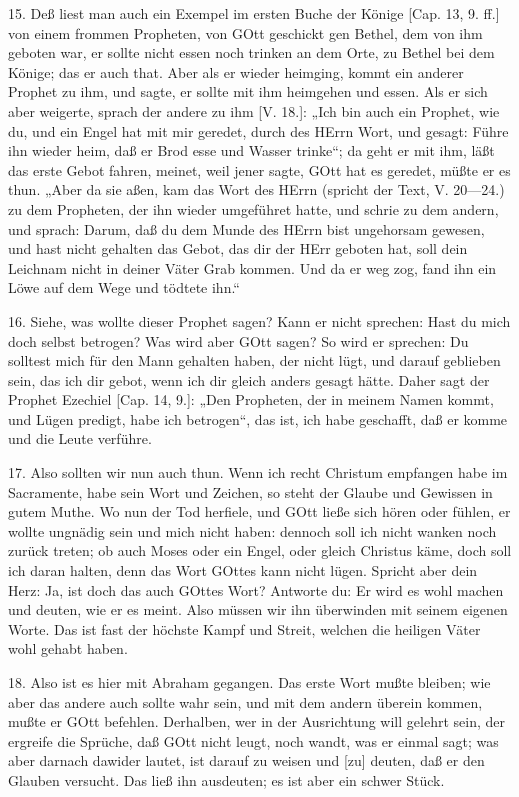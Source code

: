 15. Deß liest man auch ein Exempel im ersten Buche der Könige [Cap. 13, 9. ff.] von einem frommen Propheten, von GOtt geschickt gen Bethel, dem von ihm geboten war, er sollte nicht essen noch trinken an dem Orte, zu Bethel bei dem Könige; das er auch that. Aber als er wieder heimging, kommt ein anderer Prophet zu ihm, und sagte, er sollte mit ihm heimgehen und essen. Als er sich aber weigerte, sprach der andere zu ihm [V. 18.]: „Ich bin auch ein Prophet, wie du, und ein Engel hat mit mir geredet, durch des HErrn Wort, und gesagt: Führe ihn wieder heim, daß er Brod esse und Wasser trinke“; da geht er mit ihm, läßt das erste Gebot fahren, meinet, weil jener sagte, GOtt hat es geredet, müßte er es thun. „Aber da sie aßen, kam das Wort des HErrn (spricht der Text, V. 20—24.) zu dem Propheten, der ihn wieder umgeführet hatte, und schrie zu dem andern, und sprach: Darum, daß du dem Munde des HErrn bist ungehorsam gewesen, und hast nicht gehalten das Gebot, das dir der HErr geboten hat, soll dein Leichnam nicht in deiner Väter Grab kommen. Und da er weg zog, fand ihn ein Löwe auf dem Wege und tödtete ihn.“

16. Siehe, was wollte dieser Prophet sagen? Kann er nicht sprechen: Hast du mich doch selbst betrogen? Was wird aber GOtt sagen? So wird er sprechen: Du solltest mich für den Mann gehalten haben, der nicht lügt, und darauf geblieben sein, das ich dir gebot, wenn ich dir gleich anders gesagt hätte. Daher sagt der Prophet Ezechiel [Cap. 14, 9.]: „Den Propheten, der in meinem Namen kommt, und Lügen predigt, habe ich betrogen“, das ist, ich habe geschafft, daß er komme und die Leute verführe.

17. Also sollten wir nun auch thun. Wenn ich recht Christum empfangen habe im Sacramente, habe sein Wort und Zeichen, so steht der Glaube und Gewissen in gutem Muthe. Wo nun der Tod herfiele, und GOtt ließe sich hören oder fühlen, er wollte ungnädig sein und mich nicht haben: dennoch soll ich nicht wanken noch zurück treten; ob auch Moses oder ein Engel, oder gleich Christus käme, doch soll ich daran halten, denn das Wort GOttes kann nicht lügen. Spricht aber dein Herz: Ja, ist doch das auch
GOttes Wort? Antworte du: Er wird es wohl machen und deuten, wie er es meint. Also müssen wir ihn überwinden mit seinem eigenen Worte. Das ist fast der höchste Kampf und Streit, welchen die heiligen Väter wohl gehabt haben.

18. Also ist es hier mit Abraham gegangen. Das erste Wort mußte bleiben; wie aber das andere auch sollte wahr sein, und mit dem andern überein kommen, mußte er GOtt befehlen. Derhalben, wer in der Ausrichtung will gelehrt sein, der ergreife die Sprüche, daß GOtt nicht leugt, noch wandt, was er einmal sagt; was aber darnach dawider lautet, ist darauf zu weisen und [zu] deuten, daß er den Glauben versucht. Das ließ ihn ausdeuten; es ist aber ein schwer Stück.

